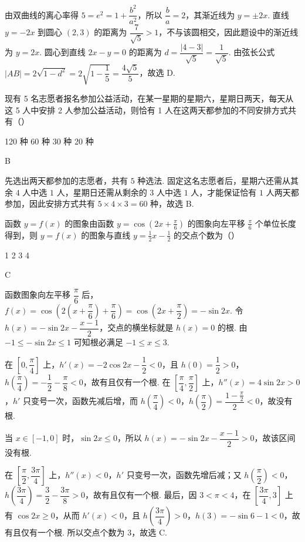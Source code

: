 \begin{solution}
由双曲线的离心率得
\(5=e^2=1+\dfrac{b^2}{a^2}\)，所以 \(\dfrac ba=2\)，其渐近线为 \(y=\pm2x\). 直线 \(y=-2x\) 到圆心
\((2,3)\) 的距离为 \(\dfrac{7}{\sqrt5}>1\)，不与该圆相交，因此题设中的渐近线为 \(y=2x\). 圆心到直线
\(2x-y=0\) 的距离为 \(d=\dfrac{|4-3|}{\sqrt5}=\dfrac1{\sqrt5}\). 由弦长公式
\(\lvert AB\rvert=2\sqrt{1-d^2}=2\sqrt{1-\dfrac15}=\dfrac{4\sqrt5}{5}\)，故选 D.
\end{solution}

\begin{problem}
现有 5 名志愿者报名参加公益活动，在某一星期的星期六，星期日两天，每天从这 5 人中安排 2 人参加公益活动，则恰有 1 人在这两天都参加的不同安排方式共有（\quad）

\choices
    {120 种}
    {60 种}
    {30 种}
    {20 种}
\end{problem}

\begin{answer}
B
\end{answer}

\begin{solution}
先选出两天都参加的志愿者，共有 \(5\) 种选法. 固定这名志愿者后，星期六还需从其余 \(4\) 人中选 \(1\) 人，星期日还需从剩余的 \(3\) 人中选 \(1\) 人，才能保证恰有 \(1\) 人两天都参加，因此安排方式共有
\(5\times4\times3=60\) 种，故选 B.
\end{solution}

\begin{problem}
函数 \( y=f(x) \) 的图象由函数 \( y=\cos\left( 2x+\frac{\pi}{6} \right) \) 的图象向左平移 \( \frac{\pi}{6} \) 个单位长度得到，则 \( y=f(x) \) 的图象与直线 \( y=\frac12x-\frac12 \) 的交点个数为（\quad）

\choices
    {1}
    {2}
    {3}
    {4}
\end{problem}

\begin{answer}
C
\end{answer}

\begin{solution}
函数图象向左平移 \(\dfrac\pi6\) 后，
\(f(x)=\cos\left(2\left(x+\dfrac\pi6\right)+\dfrac\pi6\right)=\cos\left(2x+\dfrac\pi2\right)=-\sin2x\). 令
\(h(x)=-\sin2x-\dfrac{x-1}{2}\)，交点的横坐标就是 \(h(x)=0\) 的根. 由
\(-1\leq -\sin2x\leq1\) 可知根必满足 \(-1\leq x\leq3\).

在 \([0,\dfrac\pi4]\) 上，\(h'(x)=-2\cos2x-\dfrac12<0\)，且
\(h(0)=\dfrac12>0\)，\(h(\dfrac\pi4)=-\dfrac12-\dfrac\pi8<0\)，故有且仅有一个根. 在 \([\dfrac\pi4,\dfrac\pi2]\) 上，\(h''(x)=4\sin2x>0\)，\(h'\) 只变号一次，函数先减后增，而
\(h(\dfrac\pi4)<0\)，\(h(\dfrac\pi2)=\dfrac{1-\frac{\pi}{2}}{2}<0\)，故没有根.

当 \(x\in[-1,0]\) 时，\(\sin2x\leq0\)，所以
\(h(x)=-\sin2x-\dfrac{x-1}{2}>0\)，故该区间没有根.

在 \([\dfrac\pi2,\dfrac{3\pi}4]\) 上，\(h''(x)<0\)，\(h'\) 只变号一次，函数先增后减；又
\(h(\dfrac\pi2)<0\)，\(h(\dfrac{3\pi}4)=\dfrac32-\dfrac{3\pi}{8}>0\)，故有且仅有一个根. 最后，因 \(3<\pi<4\)，在 \([\dfrac{3\pi}4,3]\) 上有 \(\cos2x\geq0\)，从而 \(h'(x)<0\)，且
\(h(\dfrac{3\pi}4)>0\)，\(h(3)=-\sin6-1<0\)，故有且仅有一个根. 所以交点个数为 \(3\)，故选 C.
\end{solution}

